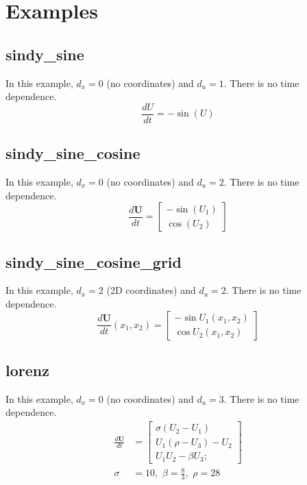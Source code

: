 \documentclass{article}
\let\vec\mathbf
\begin{document}
\section{Examples}

\subsection{sindy\_sine}
In this example, $d_x = 0$ (no coordinates) and $d_u = 1$. There is no time dependence.
\begin{equation*}
\frac{dU}{dt} = -\sin(U)
\end{equation*}


\subsection{sindy\_sine\_cosine}
In this example, $d_x = 0$ (no coordinates) and $d_u = 2$. There is no time dependence.
\begin{equation*}
\frac{d\vec{U}}{dt} =
\begin{bmatrix}
-\sin(U_1) \\ \cos(U_2)
\end{bmatrix}
\end{equation*}


\subsection{sindy\_sine\_cosine\_grid}
In this example, $d_x = 2$ (2D coordinates) and $d_u = 2$. There is no time dependence.
\begin{equation*}
\frac{d\vec{U}}{dt}(x_1, x_2) =
\begin{bmatrix}
-\sin U_1(x_1,x_2) \\ \cos U_2(x_1,x_2)
\end{bmatrix}
\end{equation*}


\subsection{lorenz}
In this example, $d_x = 0$ (no coordinates) and $d_u = 3$. There is no time dependence.
\begin{align*}
\frac{d\vec{U}}{dt} &=
\begin{bmatrix}
\sigma(U_2-U_1) \\
U_1(\rho-U_3)-U_2 \\
U_1U_2-\beta U_3;
\end{bmatrix} \\
\sigma &= 10,\,\, \beta = \frac{8}{3},\,\, \rho = 28
\end{align*}
\end{document}
